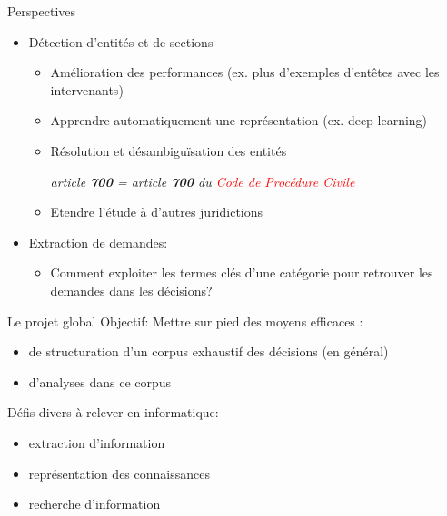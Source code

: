 \documentclass[newPxFont,pagenumber]{beamer}
\begin{document}
\begin{frame}[c]{Perspectives}
\begin{itemize}
\item Détection d'entités et de sections
\begin{itemize}
\item Amélioration des performances (ex.  plus d'exemples d'entêtes avec les intervenants)
\item Apprendre automatiquement une représentation (ex. deep learning)
\item Résolution et désambiguïsation des entités

\begin{center}
\textit{article {\bf 700} = article {\bf 700} du \textcolor{red}{Code de Procédure Civile}}
\end{center}

\item Etendre l'étude à d'autres juridictions
\end{itemize}
\item Extraction de demandes:
\begin{itemize}
\item Comment exploiter les termes clés d'une catégorie pour retrouver les demandes dans les décisions?
\end{itemize}
\end{itemize}
\end{frame}

\begin{frame}{Le projet global}
Objectif: Mettre sur pied des moyens efficaces :
\begin{itemize}
\item de structuration d'un corpus exhaustif des décisions (en général)

\item d'analyses dans ce corpus
\end{itemize}

Défis divers à relever en informatique:
\begin{itemize}
\item extraction d'information
\item représentation des connaissances
\item recherche d'information
\end{itemize}
\end{frame}

\end{document}
